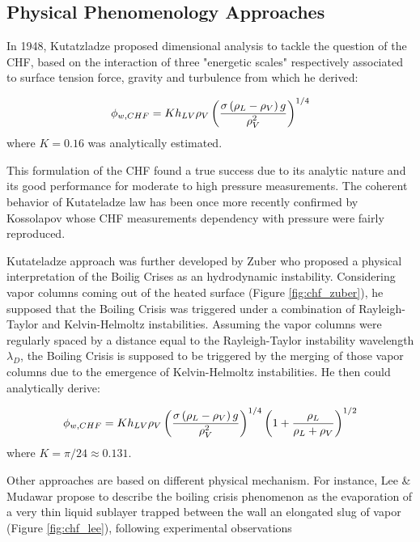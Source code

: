 \subsection{Physical Phenomenology Approaches}


In 1948, Kutatzladze \cite{kutateladze} proposed dimensional analysis to tackle the question of the CHF, based on the interaction of three "energetic scales" respectively associated to surface tension force, gravity and turbulence from which he derived:

\begin{equation}
\phi_{w,CHF} = K h_{LV} \rho_{V} \left( \frac{\sigma \left( \rho_{L} - \rho_{V} \right)g}{\rho_{V}^{2}} \right)^{1/4}
\label{eq:chf_kutateladze}
\end{equation} 
where $K=0.16$ was analytically estimated.

\npar

This formulation of the CHF found a true success due to its analytic nature and its good performance for moderate to high pressure measurements. The coherent behavior of Kutateladze law has been once more recently confirmed by Kossolapov \cite{kossolapov_experimental_2021} whose CHF measurements dependency with pressure were fairly reproduced.

\npar

Kutateladze approach was further developed by Zuber \cite{zuber_1958} who proposed a physical interpretation of the  Boilig Crises as an hydrodynamic instability. Considering vapor columns coming out of the heated surface (Figure \ref{fig:chf_zuber}), he supposed that the Boiling Crisis was triggered under a combination of Rayleigh-Taylor and Kelvin-Helmoltz instabilities. Assuming the vapor columns were regularly spaced by a distance equal to the Rayleigh-Taylor instability wavelength $\lambda_{D}$, the Boiling Crisis is supposed to be triggered by the merging of those vapor columns due to the emergence of Kelvin-Helmoltz instabilities. He then could analytically derive:

\begin{equation}
\phi_{w,CHF} = K h_{LV} \rho_{V} \left( \frac{\sigma \left( \rho_{L} - \rho_{V} \right)g}{\rho_{V}^{2}} \right)^{1/4} \left( 1 + \dfrac{\rho_{L}}{\rho_{L}+\rho_{V}} \right)^{1/2}
\label{eq:chf_zuber}
\end{equation} 
where $K=\pi / 24 \approx 0.131$.

\npar


Other approaches are based on different physical mechanism. For instance, Lee \& Mudawar \cite{lee_mudawar} propose to describe the boiling crisis phenomenon as the evaporation of a very thin liquid sublayer trapped between the wall an elongated slug of vapor (Figure \ref{fig:chf_lee}), following experimental observations %

